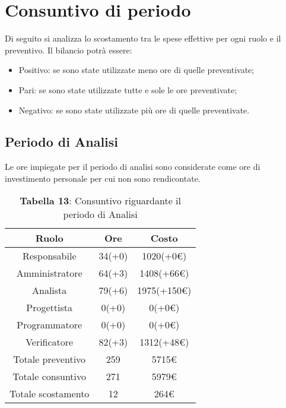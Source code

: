 \section{Consuntivo di periodo}
Di seguito si analizza lo scostamento tra le spese effettive per ogni ruolo e il preventivo. Il bilancio potrà essere:
\begin{itemize}
	\item Positivo: se sono state utilizzate meno ore di quelle preventivate;
	\item Pari: se sono state utilizzate tutte e sole le ore preventivate;
	\item Negativo: se sono state utilizzate più ore di quelle preventivate.
\end{itemize}
\subsection{Periodo di Analisi}
Le ore impiegate per il periodo di analisi sono considerate come ore di investimento personale per cui non sono rendicontate.
\begin{table}[H]
	\centering
	\renewcommand{\arraystretch}{1.5}
	\begin{tabular}{|c|c|c|}
		\hline
		\rowcolor{lighter-grayer}
Ruolo & Ore & Costo \\ \hline
Responsabile & 34(+0) & 1020(+0\euro) \\ \hline
Amministratore & 64(+3) & 1408(+66\euro) \\ \hline
Analista & 79(+6) & 1975(+150\euro) \\ \hline
Progettista & 0(+0) & 0(+0\euro) \\ \hline
Programmatore & 0(+0) & 0(+0\euro) \\ \hline
Verificatore & 82(+3) & 1312(+48\euro) \\ \hline
Totale preventivo & 259 & 5715\euro \\ \hline
Totale consuntivo & 271 & 5979\euro \\ \hline
Totale scostamento & 12 & 264\euro \\ \hline
	\end{tabular}
	\caption*{\textbf{Tabella 13}: Consuntivo riguardante il periodo di Analisi\\}
\end{table}
